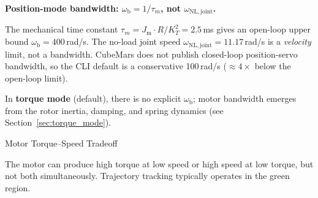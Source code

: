 \documentclass[11pt,a4paper]{article}
\newcommand{\wb}{\omega_{\mathrm{b}}}
\newcommand{\Jm}{J_{\mathrm{m}}}
\begin{document}
\begin{warnbox}
\textbf{Position-mode bandwidth: $\wb = 1/\tau_m$, not $\omega_{\mathrm{NL,joint}}$.}

The mechanical time constant $\tau_m = \Jm \cdot R / K_T^2 = 2.5$\,ms gives an open-loop upper bound $\wb = 400$\,rad/s.  The no-load joint speed $\omega_{\mathrm{NL,joint}} = 11.17$\,rad/s is a \emph{velocity} limit, not a bandwidth.  CubeMars does not publish closed-loop position-servo bandwidth, so the CLI default is a conservative 100\,rad/s ($\approx 4\times$ below the open-loop limit).

In \textbf{torque mode} (default), there is no explicit $\wb$; motor bandwidth emerges from the rotor inertia, damping, and spring dynamics (see Section~\ref{sec:torque_mode}).
\end{warnbox}

\begin{archbox}{Motor Torque--Speed Tradeoff}
\begin{center}
\end{center}
The motor can produce high torque at low speed or high speed at low torque, but not both simultaneously.  Trajectory tracking typically operates in the green region.
\end{archbox}
\end{document}
